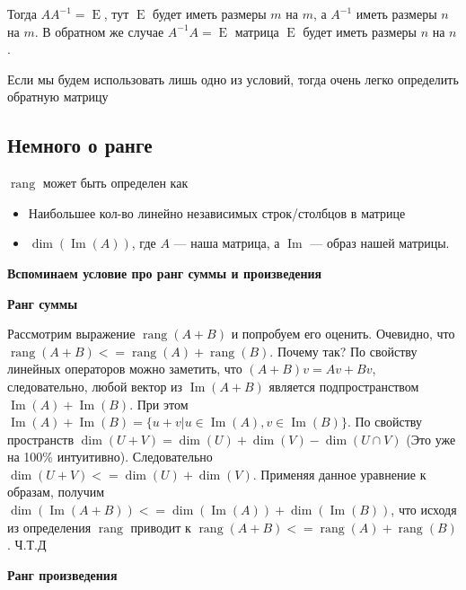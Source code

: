 \documentclass{article}
\begin{document}
    Тогда $A A^{-1} = \operatorname{E}$, тут $\operatorname{E}$ будет иметь размеры $m$ на $m$, а $A^{-1}$ иметь размеры $n$ на $m$.
    В обратном же случае $A^{-1} A = \operatorname{E}$ матрица $\operatorname{E}$ будет иметь размеры $n$ на $n$.

    Если мы будем использовать лишь одно из условий, тогда очень легко определить обратную матрицу

    \subsection{Немного о ранге}

    $\operatorname{rang}$ может быть определен как

    \begin{itemize}
        \item Наибольшее кол-во линейно независимых строк/столбцов в матрице
        \item $\dim(\operatorname{Im}(A) )$, где $A$ --- наша матрица, а $\operatorname{Im}$ --- образ нашей матрицы.
    \end{itemize}

    \quad

    \textbf{Вспоминаем условие про ранг суммы и произведения}

    \quad

    \textbf{Ранг суммы}

    Рассмотрим выражение $\operatorname{rang}(A + B)$ и попробуем его оценить.
    Очевидно, что $\operatorname{rang}(A + B) <= \operatorname{rang}(A) + \operatorname{rang}(B)$.
    Почему так?
    По свойству линейных операторов можно заметить, что $(A + B)v = Av + Bv$, следовательно,
    любой вектор из $\operatorname{Im}(A + B)$ является подпространством $\operatorname{Im}(A) + \operatorname{Im}(B)$.
    При этом $\operatorname{Im}(A) + \operatorname{Im}(B) = \{u + v | u \in \operatorname{Im}(A), v \in \operatorname{Im}(B)\}$.
    По свойству пространств $\dim(U + V) = \dim(U) + \dim(V) - \dim(U \cap V)$ (Это уже на 100\% интуитивно).
    Следовательно $\dim(U + V) <= \dim(U) + \dim(V)$.
    Применяя данное уравнение к образам, получим $\dim(\operatorname{Im}(A + B)) <= \dim(\operatorname{Im}(A)) + \dim(\operatorname{Im}(B))$,
    что исходя из определения $\operatorname{rang}$ приводит к $\operatorname{rang}(A + B) <= \operatorname{rang}(A) + \operatorname{rang}(B)$.
    Ч.Т.Д

    \quad 
    
    \textbf{Ранг произведения}
\end{document}
